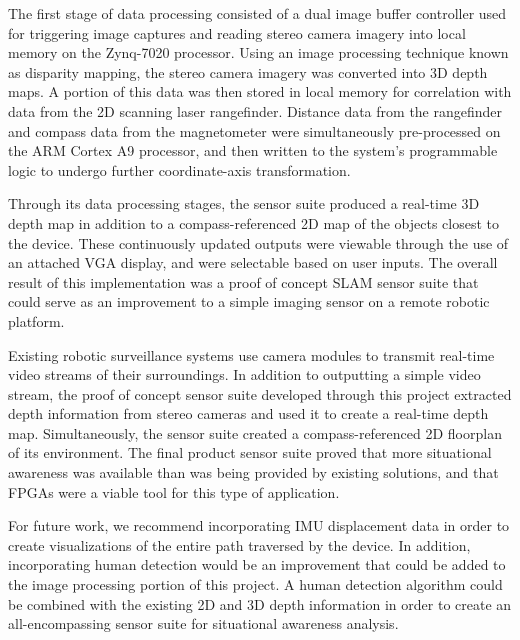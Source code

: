 \par
The first stage of data processing consisted of a dual image buffer controller used for triggering image captures and reading stereo camera imagery into local memory on the Zynq-7020 processor. Using an image processing technique known as disparity mapping, the stereo camera imagery was converted into 3D depth maps. A portion of this data was then stored in local memory for correlation with data from the 2D scanning laser rangefinder. Distance data from the rangefinder and compass data from the magnetometer were simultaneously pre-processed on the ARM Cortex A9 processor, and then written to the system's programmable logic to undergo further coordinate-axis transformation. 
\par
Through its data processing stages, the sensor suite produced a real-time 3D depth map in addition to a compass-referenced 2D map of the objects closest to the device. These continuously updated outputs were viewable through the use of an attached VGA display, and were selectable based on user inputs. The overall result of this implementation was a proof of concept SLAM sensor suite that could serve as an improvement to a simple imaging sensor on a remote robotic platform.
\par
Existing robotic surveillance systems use camera modules to transmit real-time video streams of their surroundings. In addition to outputting a simple video stream, the proof of concept sensor suite developed through this project extracted depth information from stereo cameras and used it to create a real-time depth map. Simultaneously, the sensor suite created a compass-referenced 2D floorplan of its environment. The final product sensor suite proved that more situational awareness was available than was being provided by existing solutions, and that FPGAs were a viable tool for this type of application. 
\par
For future work, we recommend incorporating IMU displacement data in order to create visualizations of the entire path traversed by the device. In addition, incorporating human detection would be an improvement that could be added to the image processing portion of this project. A human detection algorithm could be combined with the existing 2D and 3D depth information in order to create an all-encompassing sensor suite for situational awareness analysis. 





